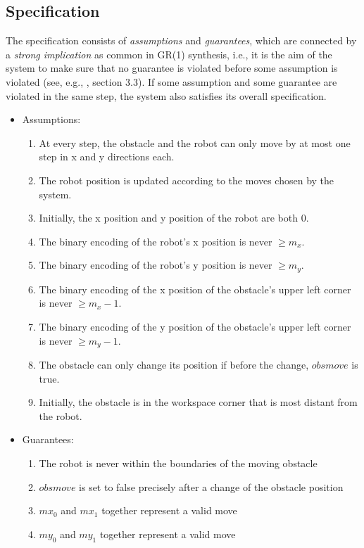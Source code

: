 \documentclass[a4paper,conference,10pt]{IEEEtran}
\begin{document}
\subsection{Specification}
\noindent The specification consists of \emph{assumptions} and \emph{guarantees}, which are connected by a \emph{strong implication} as common in GR(1) synthesis, i.e., it is the aim of the system to make sure that no guarantee is violated before some assumption is violated (see, e.g., \cite{DBLP:journals/jcss/BloemJPPS12}, section 3.3). If some assumption and some guarantee are violated in the same step, the system also satisfies its overall specification.
\begin{itemize}
\item Assumptions:
\begin{enumerate}
\item At every step, the obstacle and the robot can only move by at most one step in x and y directions each.
\item The robot position is updated according to the moves chosen by the system.
\item Initially, the x position and y position of the robot are both $0$.
\item The binary encoding of the robot's x position is never $\geq m_x$.
\item The binary encoding of the robot's y position is never $\geq m_y$.
\item The binary encoding of the x position of the obstacle's upper left corner is never $\geq m_x - 1$.
\item The binary encoding of the y position of the obstacle's upper left corner is never $\geq m_y - 1$.
\item \label{item:ObsMove} The obstacle can only change its position if before the change, $\mathit{obsmove}$ is true.
\item Initially, the obstacle is in the workspace corner that is most distant from the robot.
\end{enumerate}
\item Guarantees:
\begin{enumerate}
\item The robot is never within the boundaries of the moving obstacle
\item $\mathit{obsmove}$ is set to false precisely after a change of the obstacle position
\item $\mathit{mx}_0$ and $\mathit{mx}_1$ together represent a valid move
\item $\mathit{my}_0$ and $\mathit{my}_1$ together represent a valid move
\end{enumerate}
\end{itemize}
\end{document}
